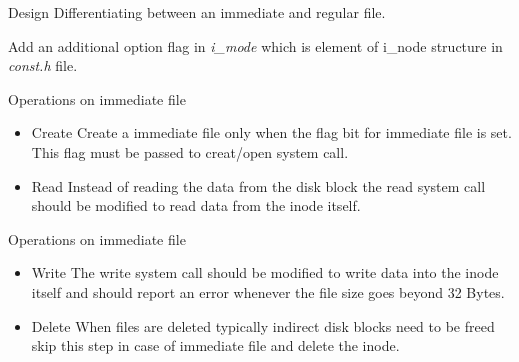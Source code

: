 \documentclass{beamer}
\begin{document}
\begin{frame}{Design}
Differentiating between an immediate and regular file. \linebreak
\begin{small}
Add an additional option flag in { \em i\_mode } which is element of i\_node structure in { \em const.h} file. 
\end{small}
\begin{tiny}

\end{tiny}
\end{frame}

\begin{frame}{Operations on immediate file}
\begin{itemize}
\item Create \linebreak
Create a immediate file only when the flag bit for immediate file is set. This flag must be passed to creat/open system call.\linebreak
\item Read \linebreak
Instead of reading the data from the disk block the read system call should be modified to read data from the inode itself. \linebreak
\end{itemize}
\end{frame}


\begin{frame}{Operations on immediate file}
\begin{itemize}
\item Write \linebreak
The write system call should be modified to write data into the inode itself and should report an error whenever the file size goes beyond 32 Bytes.\linebreak
\item Delete	\linebreak
When files are deleted typically indirect disk blocks need to be freed skip this step in case of immediate file and delete the inode. \linebreak
\end{itemize}
\end{frame}









%
\end{document}

